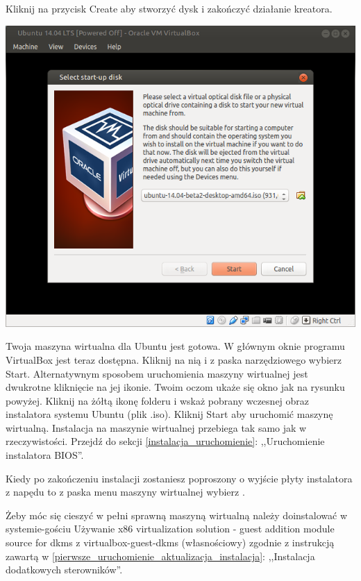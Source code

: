 Kliknij na przycisk \textcolor{ubuntu_orange}{Create} aby stworzyć dysk i zakończyć działanie kreatora.
\clearpage
\begin{center}
	\includegraphics[width=\linewidth]{images/virtualbox_start.png}
\end{center}

Twoja maszyna wirtualna dla Ubuntu jest gotowa. W głównym oknie programu VirtualBox jest teraz dostępna. Kliknij na nią i z paska narzędziowego wybierz \textcolor{ubuntu_orange}{Start}. Alternatywnym sposobem uruchomienia maszyny wirtualnej jest dwukrotne kliknięcie na jej ikonie. Twoim oczom ukaże się okno jak na rysunku powyżej. Kliknij na żółtą ikonę folderu i wskaż pobrany wczesnej obraz instalatora systemu Ubuntu (plik .iso). Kliknij \textcolor{ubuntu_orange}{Start} aby uruchomić maszynę wirtualną. Instalacja na maszynie wirtualnej przebiega tak samo jak w rzeczywistości. Przejdź do sekcji \ref{instalacja_uruchomienie}: ,,Uruchomienie instalatora BIOS''.

Kiedy po zakończeniu instalacji zostaniesz poproszony o wyjście płyty instalatora z napędu to z paska menu maszyny wirtualnej wybierz .

Żeby móc się cieszyć w pełni sprawną maszyną wirtualną należy doinstalować w systemie-gościu \textcolor{ubuntu_orange}{Używanie x86 virtualization solution - guest addition module source for dkms z virtualbox-guest-dkms (własnościowy)} zgodnie z instrukcją zawartą w \ref{pierwsze_uruchomienie_aktualizacja_instalacja}: ,,Instalacja dodatkowych sterowników''.
\clearpage
